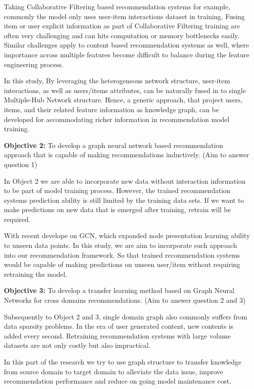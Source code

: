Taking Collaborative Filtering based recommendation systems for example, commonly the model only uses user-item interactions dataset in training. Fusing item or user explicit information as part of Collaborative Filtering training are often very challenging and can hits computation or memory bottlenecks easily. Similar challenges apply to content based recommendation systems as well, where importance across multiple features become difficult to balance during the feature engineering process.

In this study, By leveraging the heterogeneous network structure, user-item interactions, as well as users/items attributes, can be naturally fused in to single Multiple-Hub Network \citep{Shi2017} structure. Hence, a generic approach, that project users, items, and their related feature information as knowledge graph, can be developed for accommodating richer information in recommendation model training.

\bigskip
\textbf{Objective 2:} To develop a graph neural network based recommendation approach that is capable of making recommendations inductively. (Aim to answer question 1)

In Object 2 we are able to incorporate new data without interaction information to be part of model training process. However, the trained recommendation systems prediction ability is still limited by the training data sets. If we want to make predictions on new data that is emerged after training, retrain will be required. 

With recent develope on GCN, which expanded node presentation learning ability to unseen data points. In this study, we are aim to incorporate such approach into our recommendation framework. So that trained recommendation systems would be capable of making predictions on unseen user/item without requiring retraining the model.

\bigskip
\textbf{Objective 3:} To develop a transfer learning method based on Graph Neural Networks for cross domains recommendations. (Aim to answer question 2 and 3)

Subsequently to Object 2 and 3, single domain graph also commonly suffers from data sparsity problems. In the era of user generated content, new contents is added every second. Retraining recommendation systems with large volume datasets are not only costly but also impractical.

In this part of the research we try to use graph structure to transfer knowledge from source domain to target domain to alleviate the data issue, improve recommendation performance and reduce on going model maintenance cost.

